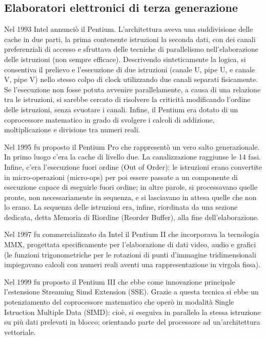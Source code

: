 \documentclass[12pt]{article}
\begin{document}
\subsection{Elaboratori elettronici di terza generazione}
Nel 1993 Intel annunciò il Pentium. L’architettura aveva una suddivisione delle cache in due parti, la prima contenente istruzioni la seconda dati, con dei canali preferenziali di accesso e sfruttava delle tecniche di parallelismo nell’elaborazione delle istruzioni (non sempre efficace). Descrivendo sinteticamente la logica, si consentiva il prelievo e l’esecuzione di due istruzioni (canale U, pipe U, e canale V, pipe V) nello stesso colpo di clock utilizzando due canali separati fisicamente. Se l’esecuzione non fosse potuta avvenire parallelamente, a causa di una relazione tra le istruzioni, si sarebbe cercato di risolvere la criticità modificando l’ordine delle istruzioni, senza svuotare i canali. Infine, il Pentium era dotato di un coprocessore matematico in grado di svolgere i calcoli di addizione, moltiplicazione e divisione tra numeri reali.\par\medskip\noindent
Nel 1995 fu proposto il Pentium Pro che rappresentò un vero salto generazionale. In primo luogo c’era la cache di livello due. La canalizzazione raggiunse le 14 fasi. Infine, c’era l’esecuzione fuori ordine (Out of Order): le istruzioni erano convertite in micro-operazioni (micro-ops) per poi essere passate a un componente di esecuzione capace di eseguirle fuori ordine; in altre parole, si processavano quelle pronte, non necessariamente in sequenza, e si lasciavano in attesa quelle che non lo erano. La sequenza delle istruzioni era, infine, riordinata da una sezione dedicata, detta Memoria di Riordine (Reorder Buffer), alla fine dell’elaborazione. \par\medskip\noindent
Nel 1997 fu commercializzato da Intel il Pentium II che incorporava la tecnologia MMX, progettata specificamente per l’elaborazione di dati video, audio e grafici (le funzioni trigonometriche per le rotazioni di punti d’immagine tridimensionali impiegavano calcoli con numeri reali aventi una rappresentazione in virgola fissa).\par\medskip\noindent
Nel 1999 fu proposto il Pentium III che ebbe come innovazione principale l’estensione Streaming Simd Extension (SSE). Grazie a questa tecnica si ebbe un potenziamento del coprocessore matematico che operò in modalità Single Istruction Multiple Data (SIMD): cioè, si eseguiva in parallelo la stessa istruzione su più dati prelevati in blocco; orientando parte del processore ad un’architettura vettoriale.\par\medskip\noindent
\end{document}
